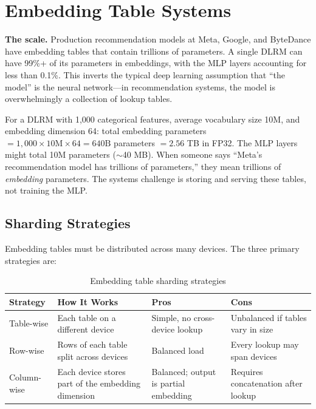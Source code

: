 \section{Embedding Table Systems}
\label{sec:embedding_systems}

\textbf{The scale.} Production recommendation models at Meta, Google, and ByteDance have embedding tables that contain trillions of parameters. A single DLRM can have 99\%+ of its parameters in embeddings, with the MLP layers accounting for less than 0.1\%. This inverts the typical deep learning assumption that ``the model'' is the neural network---in recommendation systems, the model is overwhelmingly a collection of lookup tables.

\begin{keyinsight}
For a DLRM with 1,000 categorical features, average vocabulary size 10M, and embedding dimension 64: total embedding parameters $= 1{,}000 \times 10\text{M} \times 64 = 640\text{B}$ parameters $= 2.56$ TB in FP32. The MLP layers might total 10M parameters ($\sim$40 MB). When someone says ``Meta's recommendation model has trillions of parameters,'' they mean trillions of \textit{embedding} parameters. The systems challenge is storing and serving these tables, not training the MLP.
\end{keyinsight}

\subsection{Sharding Strategies}

Embedding tables must be distributed across many devices. The three primary strategies are:

\begin{table}[H]
\centering
\caption{Embedding table sharding strategies}
\begin{tabularx}{\textwidth}{lXXX}
\toprule
\textbf{Strategy} & \textbf{How It Works} & \textbf{Pros} & \textbf{Cons} \\
\midrule
Table-wise & Each table on a different device & Simple, no cross-device lookup & Unbalanced if tables vary in size \\
Row-wise & Rows of each table split across devices & Balanced load & Every lookup may span devices \\
Column-wise & Each device stores part of the embedding dimension & Balanced; output is partial embedding & Requires concatenation after lookup \\
\bottomrule
\end{tabularx}
\end{table}

